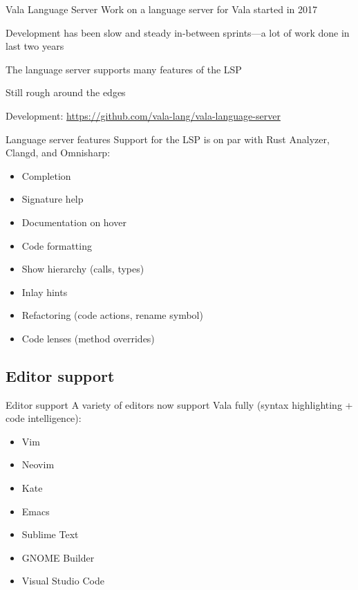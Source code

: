 \documentclass[t]{beamer}
\begin{document}
\begin{frame}[c]{Vala Language Server}
Work on a language server for Vala started in 2017

Development has been slow and steady in-between sprints---a lot of work done in last two years

The language server supports many features of the LSP

Still rough around the edges

{\small Development: \url{https://github.com/vala-lang/vala-language-server}}
\end{frame}

\begin{frame}[c]{Language server features}
Support for the LSP is on par with Rust Analyzer, Clangd, and Omnisharp:
\begin{itemize}
    \item Completion
    \item Signature help
    \item Documentation on hover
    \item Code formatting
    \item Show hierarchy (calls, types)
    \item Inlay hints
    \item Refactoring (code actions, rename symbol)
    \item Code lenses (method overrides)
\end{itemize}
\end{frame}

\subsection{Editor support}
\begin{frame}[c]{Editor support}
A variety of editors now support Vala fully (syntax highlighting + code intelligence):
\begin{itemize}
    \item Vim
    \item Neovim
    \item Kate
    \item Emacs
    \item Sublime Text
    \item GNOME Builder
    \item Visual Studio Code
\end{itemize}
\end{frame}
\end{document}
